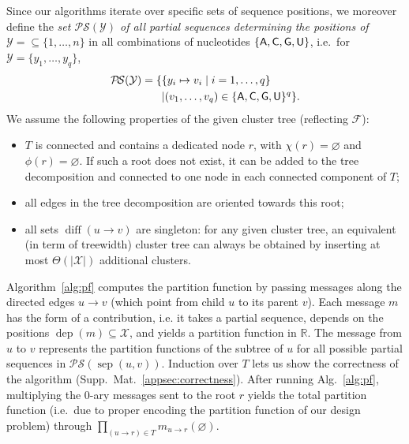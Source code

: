 \documentclass[]{bmcart}
\newcommand{\dep}{\operatorname{dep}}
\newcommand{\separator}[2]{\operatorname{sep}(#1,#2)}
\newcommand{\difference}[2]{\operatorname{diff}(#1 \rightarrow #2)}
\newcommand{\real}{\mathbb{R}}
\newcommand{\Message}[2]{m_{#1\rightarrow #2}}
\newcommand{\partseqs}{\mathcal{P\!S}}
\newcommand{\F}{\mathcal{F}}
\newcommand{\X}{\mathcal{X}}
\newcommand{\Y}{\mathcal{Y}}
\newcommand{\Def}[1]{\emph{#1}}
\newcommand{\Nuc}[1]{{\sf #1}}
\newcommand{\Ab}{\Nuc{A}}
\newcommand{\Cb}{\Nuc{C}}
\newcommand{\Gb}{\Nuc{G}}
\newcommand{\Ub}{\Nuc{U}}
\newcommand{\evalfor}[2]{#1(#2)}
\begin{document}
Since our algorithms iterate over specific sets of sequence positions, we moreover define
the \Def{set $\partseqs(\Y)$ of all partial sequences determining the positions of $\Y=\subseteq\{1,\dots,n\}$} in all combinations of nucleotides $\{\Ab,\Cb,\Gb,\Ub\}$,
i.e.~for $\Y=\{y_1,\dots,y_{q}\}$,
\begin{align*}
\partseqs(\Y) = \{ & \{ y_i\mapsto v_i \mid i=1,\dots,q \} \\& | (v_1,\dots,v_{q}) \in \{\Ab,\Cb,\Gb,\Ub\}^{q} \}.
\end{align*}
%
We assume the following properties of the given cluster tree (reflecting $\F$):
\begin{itemize}
\item
$T$ is
connected and contains a dedicated node $r$, with
$\chi(r)=\varnothing$ and $\phi(r)=\varnothing$. If such a root does not exist, it can be added to the tree decomposition and connected to one node in each connected component of $T$;
\item
all edges in the tree decomposition are oriented towards this root;
\item
all sets $\difference{u}{v}$ are singleton: for any given
cluster tree, an equivalent (in term of treewidth) cluster tree can
always be obtained by inserting at most $\Theta(|\X|)$ additional
clusters.
\end{itemize}

Algorithm~\ref{alg:pf} computes the partition function by passing
messages along the directed edges $u\to v$ (which point from 
child $u$ to its parent $v$). Each message $m$ has the form of a contribution, i.e. it takes a partial sequence, depends
on the positions $\dep(m)\subseteq \X$, and yields a partition function
in $\real$. The message from $u$ to $v$ represents the
partition functions of the subtree of $u$ for all possible partial
sequences in $\partseqs(\separator{u}{v})$. Induction over $T$ lets us show
the correctness of the algorithm
(Supp.\ Mat.~\ref{appsec:correctness}).  After running
Alg.~\ref{alg:pf}, multiplying the 0-ary messages sent to the root $r$
yields the total partition function (i.e.~due to proper encoding the partition function of our design problem) through
\begin{math}
  \prod_{(u\to{}r)\in T} \evalfor{\Message{u}{r}}{\varnothing}.
\end{math}
\end{document}
